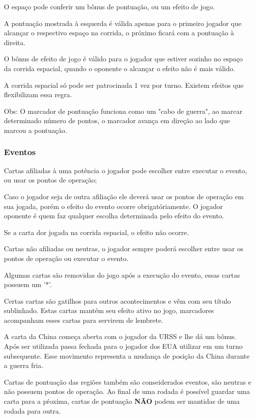 \documentclass[11pt]{article}
\begin{document}
O espaço pode conferir um bônus de pontuação, ou um efeito de jogo.

A pontuação mostrada à esquerda é válida apenas para o primeiro jogador que alcançar o respectivo espaço na corrida, o próximo ficará com a pontuação à direita.

O bônus de efeito de jogo é válido para o jogador que estiver sozinho no espaço da corrida espacial, quando o oponente o alcançar o efeito não é mais válido.

A corrida espacial só pode ser patrocinada 1 vez por turno. Existem efeitos que flexibilizam essa regra.

Obs: O marcador de pontuação funciona como um "cabo de guerra", ao marcar determinado número de pontos, o marcador avança em direção ao lado que marcou a pontuação.

\subsubsection{Eventos}
\label{sec:orgdb985ad}

Cartas afiliadas à uma potência o jogador pode escolher entre executar o evento, ou usar os pontos de operação;

Caso o jogador seja de outra afiliação ele deverá usar os pontos de operação em sua jogada, porém o efeito do evento ocorre obrigatóriamente. O jogador oponente é quem faz qualquer escolha determinada pelo efeito do
evento.

Se a carta dor jogada na corrida espacial, o efeito não ocorre.

Cartas não afiliadas ou neutras, o jogador sempre poderá escolher entre usar os pontos de operação ou executar o evento.

Algumas cartas são removidas do jogo após a execução do evento, essas cartas possuem um '*'.

Certas cartas são gatilhos para outros acontecimentos e vêm com seu título sublinhado. Estas cartas mantém seu efeito ativo no jogo, marcadores acompanham esses cartas para servirem de lembrete.

A carta da China começa aberta com o jogador da URSS e lhe dá um bônus. Após ser utilizada passa fechada para o jogador dos EUA utilizar em um turno subsequente. Esse movimento representa a mudança de posição
da China durante a guerra fria.

Cartas de pontuação das regiões também são conseiderados eventos, são neutras e não possuem pontos de operação. Ao final de uma rodada é possível guardar uma carta para a pŕoxima, cartas de pontuação \textbf{NÃO} podem
ser mantidas de uma rodada para outra.
\end{document}
